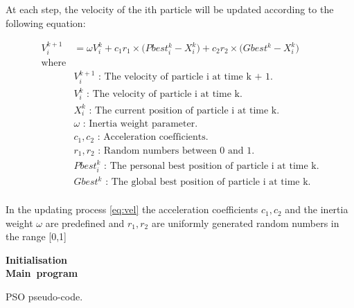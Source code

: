 \documentclass{pdfmx4020}
\begin{document}
    At each step, the velocity of the ith particle will be updated according to the following equation:

    \begin{equation} \label{eq:vel}
      \begin{split}
        V_{i}^{k+1} & = \omega V_{i}^{k} + c_1 r_1 \times \Big( Pbest_{i}^{k} - X_{i}^{k} \Big) + c_2 r_2 \times \Big( Gbest^{k} - X_{i}^{k} \Big) \\
        \text{where} & \\
        & V_i^{k+1} \text{ : The velocity of particle i at time k + 1.} \\
        & V_i^k \text{ : The velocity of particle i at time k.} \\
        & X_i^k \text{ : The current position of particle i at time k.} \\
        & \omega \text{ : Inertia weight parameter.} \\
        & c_1, c_2 \text{ : Acceleration coefficients.} \\
        & r_1, r_2 \text{ : Random numbers between 0 and 1.} \\
        & Pbest_i^k \text{ : The personal best position of particle i at time k.} \\
        & Gbest^k \text{ : The global best position of particle i at time k.} \\
      \end{split}
    \end{equation}

    In the updating process \ref{eq:vel} the acceleration coefficients $c_1, c_2$ and the inertia weight $\omega$ are predefined and $r_1, r_2$ are uniformly generated random numbers in the range [0,1]

    \begin{algorithm}[H] \label{eq:pso}
      \mbox{\textbf{Initialisation}} \\
      \mbox{\textbf{Main program}} \\      
      \caption{PSO pseudo-code.}
    \end{algorithm}
    
\end{document}
